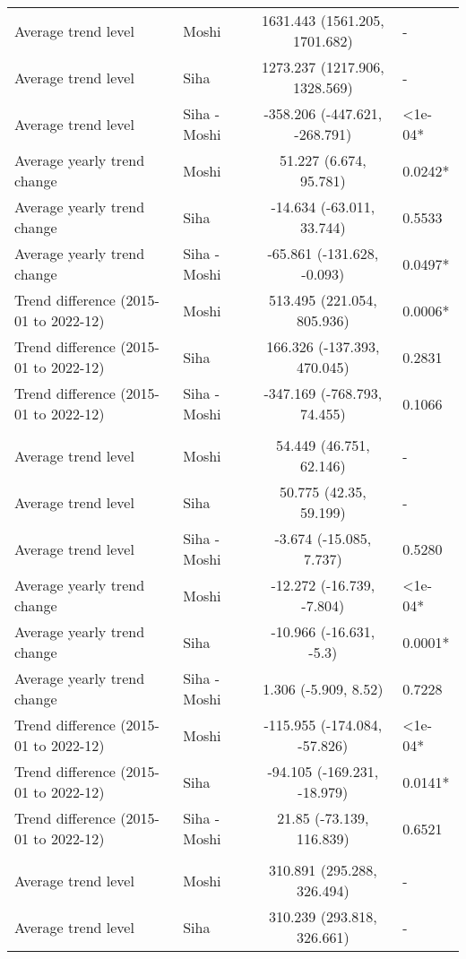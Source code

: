 \begin{longtable}{l|lcl}
Average trend level & Moshi & 1631.443 (1561.205, 1701.682) & - \\ 
Average trend level & Siha & 1273.237 (1217.906, 1328.569) & - \\ 
Average trend level & Siha - Moshi & -358.206 (-447.621, -268.791) & <1e-04* \\ 
Average yearly trend change & Moshi & 51.227 (6.674, 95.781) & 0.0242* \\ 
Average yearly trend change & Siha & -14.634 (-63.011, 33.744) & 0.5533 \\ 
Average yearly trend change & Siha - Moshi & -65.861 (-131.628, -0.093) & 0.0497* \\ 
Trend difference (2015-01 to 2022-12) & Moshi & 513.495 (221.054, 805.936) & 0.0006* \\ 
Trend difference (2015-01 to 2022-12) & Siha & 166.326 (-137.393, 470.045) & 0.2831 \\ 
Trend difference (2015-01 to 2022-12) & Siha - Moshi & -347.169 (-768.793, 74.455) & 0.1066 \\ 
\midrule\addlinespace[2.5pt]
\multicolumn{4}{l}{Malnutrition} \\[2.5pt] 
\midrule\addlinespace[2.5pt]
Average trend level & Moshi & 54.449 (46.751, 62.146) & - \\ 
Average trend level & Siha & 50.775 (42.35, 59.199) & - \\ 
Average trend level & Siha - Moshi & -3.674 (-15.085, 7.737) & 0.5280 \\ 
Average yearly trend change & Moshi & -12.272 (-16.739, -7.804) & <1e-04* \\ 
Average yearly trend change & Siha & -10.966 (-16.631, -5.3) & 0.0001* \\ 
Average yearly trend change & Siha - Moshi & 1.306 (-5.909, 8.52) & 0.7228 \\ 
Trend difference (2015-01 to 2022-12) & Moshi & -115.955 (-174.084, -57.826) & <1e-04* \\ 
Trend difference (2015-01 to 2022-12) & Siha & -94.105 (-169.231, -18.979) & 0.0141* \\ 
Trend difference (2015-01 to 2022-12) & Siha - Moshi & 21.85 (-73.139, 116.839) & 0.6521 \\ 
\midrule\addlinespace[2.5pt]
\multicolumn{4}{l}{Diarrhea} \\[2.5pt] 
\midrule\addlinespace[2.5pt]
Average trend level & Moshi & 310.891 (295.288, 326.494) & - \\ 
Average trend level & Siha & 310.239 (293.818, 326.661) & - \\ 

\end{longtable}
